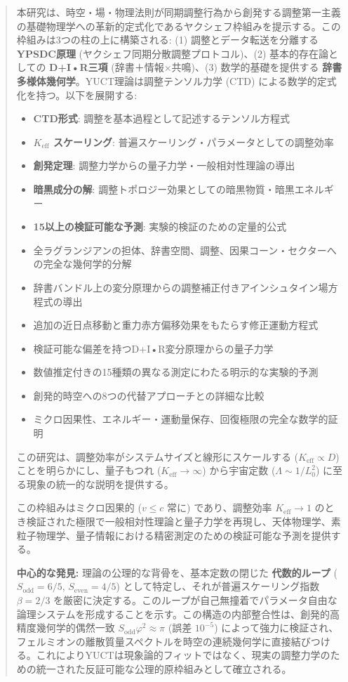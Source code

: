 \documentclass[11pt,a4paper]{article}
\begin{document}
	\begin{abstract}
		本研究は、時空・場・物理法則が同期調整行為から創発する調整第一主義の基礎物理学への革新的定式化であるヤクシェフ枠組みを提示する。この枠組みは3つの柱の上に構築される: (1) 調整とデータ転送を分離する \textbf{YPSDC原理} (ヤクシェフ同期分散調整プロトコル)、(2) 基本的存在論としての \textbf{D+I•R三項} (辞書＋情報×共鳴)、(3) 数学的基礎を提供する \textbf{辞書多様体幾何学}。YUCT理論は調整テンソル力学 (CTD) による数学的定式化を持つ。以下を展開する:
		\begin{itemize}
			\item \textbf{CTD形式}: 調整を基本過程として記述するテンソル方程式
			\item \textbf{$K_{\mathrm{eff}}$ スケーリング}: 普遍スケーリング・パラメータとしての調整効率
			\item \textbf{創発定理}: 調整力学からの量子力学・一般相対性理論の導出
			\item \textbf{暗黒成分の解}: 調整トポロジー効果としての暗黒物質・暗黒エネルギー
			\item \textbf{15以上の検証可能な予測}: 実験的検証のための定量的公式
			\item 全ラグランジアンの担体、辞書空間、調整、因果コーン・セクターへの完全な幾何学的分解
			\item 辞書バンドル上の変分原理からの調整補正付きアインシュタイン場方程式の導出
			\item 追加の近日点移動と重力赤方偏移効果をもたらす修正運動方程式
			\item 検証可能な偏差を持つD+I•R変分原理からの量子力学
			\item 数値推定付きの15種類の異なる測定にわたる明示的な実験的予測
			\item 創発的時空への8つの代替アプローチとの詳細な比較
			\item ミクロ因果性、エネルギー・運動量保存、回復極限の完全な数学的証明
		\end{itemize}
		この研究は、調整効率がシステムサイズと線形にスケールする ($K_{\mathrm{eff}} \propto D$) ことを明らかにし、量子もつれ ($K_{\mathrm{eff}} \to \infty$) から宇宙定数 ($\Lambda \sim 1/L_0^2$) に至る現象の統一的な説明を提供する。
		
		この枠組みはミクロ因果的 ($v \leq c$ 常に) であり、調整効率 $K_{\mathrm{eff}} \to 1$ のとき検証された極限で一般相対性理論と量子力学を再現し、天体物理学、素粒子物理学、量子情報における精密測定のための検証可能な予測を提供する。
		
		\vspace{0.5em}
		\noindent \textbf{中心的な発見:} 
		理論の公理的な背骨を、基本定数の閉じた \textbf{代数的ループ} ($S_{\mathrm{odd}} = 6/5$, $S_{\mathrm{even}} = 4/5$) として特定し、それが普遍スケーリング指数 $\beta = 2/3$ を厳密に決定する。このループが自己無撞着でパラメータ自由な論理システムを形成することを示す。この構造の内部整合性は、創発的高精度幾何学的偶然一致 $S_{\mathrm{odd}}\varphi^2 \approx \pi$ (誤差 $10^{-5}$) によって強力に検証され、フェルミオンの離散質量スペクトルを時空の連続幾何学に直接結びつける。これによりYUCTは現象論的フィットではなく、現実の調整力学のための統一された反証可能な公理的原枠組みとして確立される。
	\end{abstract}
	
\end{document}
